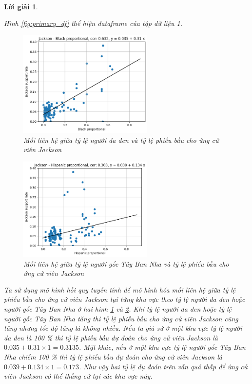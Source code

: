 \documentclass[14pt, a4paper]{article}
\theoremstyle{sltheorem}
\theoremstyle{soltheorem}
\newtheorem*{loigiai}{Lời giải}
\begin{document}
\begin{loigiai}
\begin{enumerate}
    Hình \ref{fig:primary_df} thể hiện dataframe của tập dữ liệu 1.

    \begin{figure}[H]
        \centering
        \includegraphics[width=0.6\textwidth]{figures/Jackson_support_rate-Black_proportional-Dataset_1.png}
        \caption{Mối liên hệ giữa tỷ lệ người da đen và tỷ lệ phiếu bầu cho ứng cử viên Jackson}
        \label{fig:Jackson_support_rate_Black_proportional_Dataset_1}
    \end{figure}

    \begin{figure}[H]
        \centering
        \includegraphics[width=0.6\textwidth]{figures/Jackson_support_rate-Hispanic_proportional-Dataset_1.png}
        \caption{Mối liên hệ giữa tỷ lệ người gốc Tây Ban Nha và tỷ lệ phiếu bầu cho ứng cử viên Jackson}
        \label{fig:Jackson_support_rate_Hispanic_proportional_Dataset_1}
    \end{figure}

    Ta sử dụng mô hình hồi quy tuyến tính để mô hình hóa mối liên hệ giữa tỷ lệ phiếu bầu cho ứng cử viên Jackson tại từng khu vực theo tỷ lệ người da đen hoặc người gốc Tây Ban Nha ở hai hình \ref{fig:Jackson_support_rate_Black_proportional_Dataset_1} và \ref{fig:Jackson_support_rate_Hispanic_proportional_Dataset_1}.
    Khi tỷ lệ người da đen hoặc tỷ lệ người gốc Tây Ban Nha tăng thì tỷ lệ phiếu bầu cho ứng cử viên Jackson cũng tăng nhưng tốc độ tăng là không nhiều.
    Nếu ta giả sử ở một khu vực tỷ lệ người da đen là 100 \% thì tỷ lệ phiếu bầu dự đoán cho ứng cử viên Jackson là $0.035 + 0.31 \times 1=0.3135$.
    Mặt khác, nếu ở một khu vực tỷ lệ người gốc Tây Ban Nha chiếm 100 \% thì tỷ lệ phiếu bầu dự đoán cho ứng cử viên Jackson là $0.039+0.134 \times 1=0.173$.
    Như vậy hai tỷ lệ dự đoán trên vẫn quá thấp để ứng cử viên Jackson có thể thắng cử tại các khu vực này.


\end{enumerate}
\end{loigiai}
\end{document}
